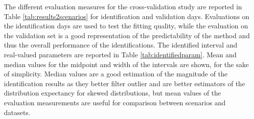 
The different evaluation measures for the cross-validation study are reported in Table \ref{tab:results2scenarios} for identification and validation days. Evaluations on the identification days are used to test the fitting quality, while the evaluation on the validation set is a good representation of the predictability of the method and thus the overall performance of the identifications. The identified interval and real-valued parameters are reported in Table \ref{tab:identifiedparam}. Mean and median values for the midpoint and width of the intervals are shown, for the sake of simplicity. Median values are a good estimation of the magnitude of the identification results as they better filter outlier and are better estimators of the distribution expectancy for skewed distributions, but mean values of the evaluation measurements are useful for comparison between scenarios and datasets.

